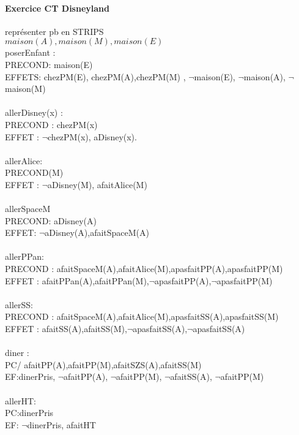 \documentclass{article}
\begin{document}
\paragraph{Exercice CT Disneyland}
représenter pb en STRIPS\\
$maison(A),maison(M),maison(E)$ \\
poserEnfant :\\
PRECOND: maison(E)\\
EFFETS: chezPM(E), chezPM(A),chezPM(M) , $\neg$maison(E), $\neg$maison(A), $\neg$maison(M) \\\\

allerDisney(x) : \\
PRECOND : chezPM(x)\\
EFFET : $ \neg$chezPM(x), aDisney(x).\\\\
allerAlice:\\
PRECOND(M)\\
EFFET : $\neg$aDisney(M), afaitAlice(M)\\\\

allerSpaceM\\
PRECOND: aDisney(A)\\
EFFET: $\neg$aDisney(A),afaitSpaceM(A)\\\\

allerPPan:\\
PRECOND : afaitSpaceM(A),afaitAlice(M),apasfaitPP(A),apasfaitPP(M)\\
EFFET : afaitPPan(A),afaitPPan(M),$\neg$apasfaitPP(A),$\neg$apasfaitPP(M)\\\\


allerSS:\\
PRECOND : afaitSpaceM(A),afaitAlice(M),apasfaitSS(A),apasfaitSS(M)\\
EFFET : afaitSS(A),afaitSS(M),$\neg$apasfaitSS(A),$\neg$apasfaitSS(A)\\\\

diner :\\
PC/ afaitPP(A),afaitPP(M),afaitSZS(A),afaitSS(M)\\
EF:dinerPris, $\neg$afaitPP(A), $\neg$afaitPP(M), $\neg$afaitSS(A), $\neg$afaitPP(M)\\\\

allerHT:\\
PC:dinerPris\\
EF: $\neg$dinerPris, afaitHT
\newpage
\end{document}
